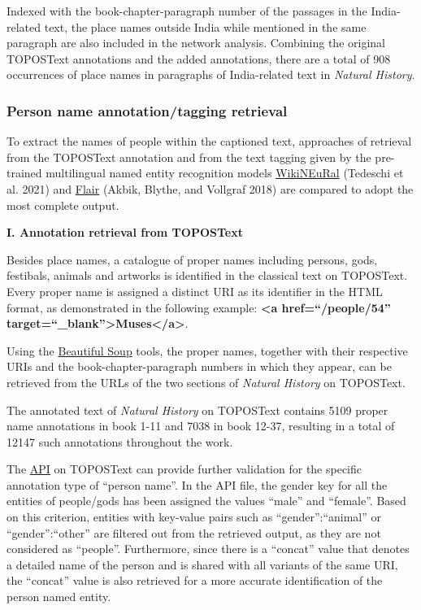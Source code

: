 \documentclass[
  12pt,
]{article}
\begin{document}
Indexed with the book-chapter-paragraph number of the passages in the
India-related text, the place names outside India while mentioned in the
same paragraph are also included in the network analysis. Combining the
original TOPOSText annotations and the added annotations, there are a
total of 908 occurrences of place names in paragraphs of India-related
text in \emph{Natural History}.

\hypertarget{person-name-annotationtagging-retrieval}{%
\subsubsection{Person name annotation/tagging
retrieval}\label{person-name-annotationtagging-retrieval}}

To extract the names of people within the captioned text, approaches of
retrieval from the TOPOSText annotation and from the text tagging given
by the pre-trained multilingual named entity recognition models
\href{https://huggingface.co/Babelscape/wikineural-multilingual-ner}{WikiNEuRal}
(Tedeschi et al. 2021) and
\href{https://huggingface.co/flair/ner-english-ontonotes-fast}{Flair}
(Akbik, Blythe, and Vollgraf 2018) are compared to adopt the most
complete output.

\textbf{I. Annotation retrieval from TOPOSText}

Besides place names, a catalogue of proper names including persons,
gods, festibals, animals and artworks is identified in the classical
text on TOPOSText. Every proper name is assigned a distinct URI as its
identifier in the HTML format, as demonstrated in the following example:
\textbf{\textless a href=``/people/54''
target=``\_blank''\textgreater Muses\textless/a\textgreater{}}.

Using the
\href{https://www.crummy.com/software/BeautifulSoup/bs4/doc/}{Beautiful
Soup} tools, the proper names, together with their respective URIs and
the book-chapter-paragraph numbers in which they appear, can be
retrieved from the URLs of the two sections of \emph{Natural History} on
TOPOSText.

The annotated text of \emph{Natural History} on TOPOSText contains 5109
proper name annotations in book 1-11 and 7038 in book 12-37, resulting
in a total of 12147 such annotations throughout the work.

The \href{https://topostext.org/api/people/readweb.php}{API} on
TOPOSText can provide further validation for the specific annotation
type of ``person name''. In the API file, the gender key for all the
entities of people/gods has been assigned the values ``male'' and
``female''. Based on this criterion, entities with key-value pairs such
as ``gender'':``animal'' or ``gender'':``other'' are filtered out from
the retrieved output, as they are not considered as ``people''.
Furthermore, since there is a ``concat'' value that denotes a detailed
name of the person and is shared with all variants of the same URI, the
``concat'' value is also retrieved for a more accurate identification of
the person named entity.
\end{document}
